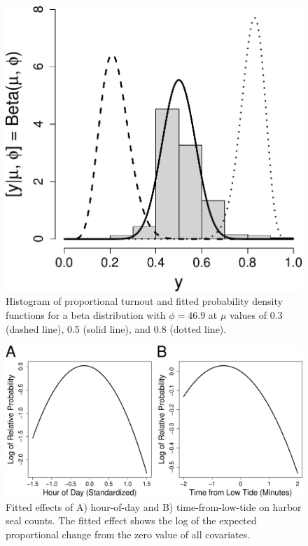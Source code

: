 \documentclass[12pt, titlepage]{article}
\begin{document}
\begin{figure}[H]
  \begin{center}
	    \includegraphics[width=.95\linewidth]{figures/TexTurn_histpdf}
  \end{center}
  \caption{Histogram of proportional turnout and fitted probability density functions for a beta distribution with $\phi = 46.9$ at $\mu$ values of 0.3 (dashed line), 0.5 (solid line), and 0.8 (dotted line). \label{Fig:TexTurn_histpdf}}
\end{figure}

\begin{figure}[H]
  \begin{center}
	    \includegraphics[width=.95\linewidth]{figures/seals_explanvar}
  \end{center}
  \caption{Fitted effects of A) hour-of-day and B) time-from-low-tide on harbor seal counts.  The fitted effect shows the log of the expected proportional change from the zero value of all covariates. \label{Fig:seals_explanvar}}
\end{figure}
\end{document}
